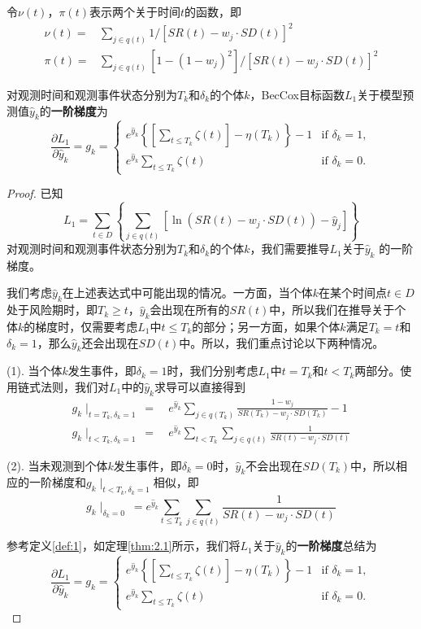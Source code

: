 \begin{definition}\label{def:2}
令$\nu(t)$，$\pi(t)$表示两个关于时间$t$的函数，即\[
\begin{split}
\nu(t) =& \sum_{j\in q(t)} 1/[SR(t) - w_j\cdot SD(t)]^2 \\
\pi(t)  =& \sum_{j\in q(t)} [1-(1-w_j)^2]/[SR(t) - w_j\cdot SD(t)]^2
\end{split}
\]
\end{definition}

\begin{theorem}\label{thm:2.1}
对观测时间和观测事件状态分别为$T_k$和$\delta_k$的个体$k$，BecCox目标函数$L_1$关于模型预测值$\hat{y}_k$的\textbf{一阶梯度}为$$
\frac{\partial L_1}{\partial \hat{y}_k} = g_k = 
\begin{cases}
e^{\hat{y}_k} \left\{ \left[\sum_{t\le T_k} \zeta(t)\right] - \eta(T_k) \right\} - 1 & \text{if } \delta_k = 1,\\
e^{\hat{y}_k} \sum_{t\le T_k} \zeta(t) & \text{if } \delta_k = 0.
\end{cases}
$$
\end{theorem}

\begin{proof}
已知$$L_1 = \sum_{t\in D} \left\{ \sum_{j\in q(t)} [\ln(SR(t)-w_j\cdot SD(t))-\hat{y}_j] \right\}$$ 对观测时间和观测事件状态分别为$T_k$和$\delta_k$的个体$k$，我们需要推导$L_1$关于$\hat{y}_k$ 的一阶梯度。

我们考虑$\hat{y}_k$在上述表达式中可能出现的情况。一方面，当个体$k$在某个时间点$t\in D$处于风险期时，即$T_k\ge t$，$\hat{y}_k$会出现在所有的$SR(t)$中，所以我们在推导关于个体$k$的梯度时，仅需要考虑$L_1$中$t \le T_k$的部分；另一方面，如果个体$k$满足$T_k=t$和$\delta_k=1$，那么$\hat{y}_k$还会出现在$SD(t)$中。所以，我们重点讨论以下两种情况。

(1). 当个体$k$发生事件，即$\delta_k=1$时，我们分别考虑$L_1$中$t=T_k$和$t<T_k$两部分。使用链式法则，我们对$L_1$中的$\hat{y}_k$求导可以直接得到\[
\begin{split}
g_k\mid_{t=T_k,\delta_k=1} \ =\ & e^{\hat{y}_k}\sum_{j\in q(T_k)} \frac{1-w_j}{SR(T_k) - w_j\cdot SD(T_k)} - 1 \\
g_k\mid_{t<T_k,\delta_k=1} \ =\ & e^{\hat{y}_k}\sum_{t<T_k} \sum_{j\in q(t)} \frac{1}{SR(t) - w_j\cdot SD(t)}
\end{split}
\]

(2). 当未观测到个体$k$发生事件，即$\delta_k=0$时，$\hat{y}_k$不会出现在$SD(T_k)$中，所以相应的一阶梯度和$g_k\mid_{t<T_k,\delta_k=1}$相似，即$$
g_k\mid_{\delta_k=0} \ = e^{\hat{y}_k}\sum_{t\le T_k} \sum_{j\in q(t)} \frac{1}{SR(t) - w_j\cdot SD(t)}
$$

参考定义\ref{def:1}，如定理\ref{thm:2.1}所示，我们将$L_1$关于$\hat{y}_k$的\textbf{一阶梯度}总结为$$
\frac{\partial L_1}{\partial \hat{y}_k} = g_k = 
\begin{cases}
e^{\hat{y}_k} \left\{ \left[\sum_{t\le T_k} \zeta(t)\right] - \eta(T_k) \right\} - 1 & \text{if } \delta_k = 1,\\
e^{\hat{y}_k} \sum_{t\le T_k} \zeta(t) & \text{if } \delta_k = 0.
\end{cases}
$$
\end{proof}

